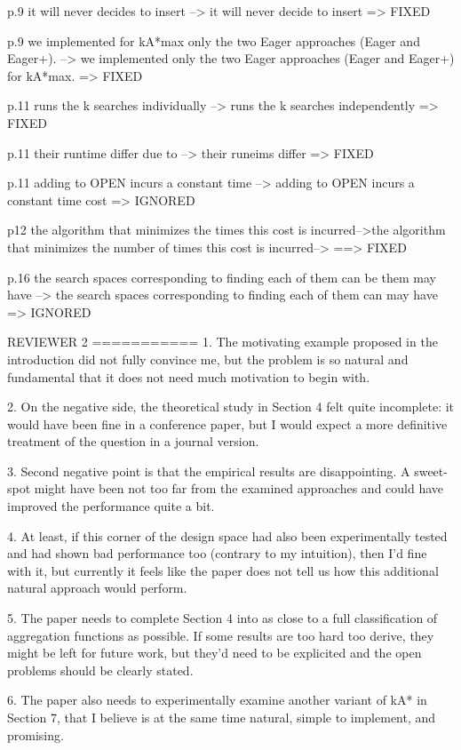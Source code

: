 p.9 it will never decides to insert --> it will never decide to
insert => FIXED

p.9 we implemented for kA*max only the two Eager approaches (Eager and
Eager+). --> we implemented only the two Eager approaches (Eager
and Eager+) for kA*max. => FIXED

p.11 runs the k searches individually --> runs the k searches
independently => FIXED

p.11 their runtime differ due to --> their runeims differ => FIXED

p.11 adding to OPEN incurs a constant time --> adding to OPEN
incurs a constant time cost => IGNORED

p12 the algorithm that minimizes the times this cost is
incurred-->the algorithm that minimizes the number of times this
cost is incurred--> ==> FIXED

p.16 the search spaces corresponding to finding each of them can be
them may have --> the search spaces corresponding to finding each
of them can may have => IGNORED


REVIEWER 2
===========
1. The motivating example proposed in the introduction
did not fully convince me, but the problem is so natural and
fundamental that it does not need much motivation to begin with. 

2. On the negative side, the theoretical study in Section 4 felt quite incomplete: it would have
been fine in a conference paper, but I would expect a more definitive
treatment of the question in a journal version.

3. Second negative point is that the
empirical results are disappointing. A sweet-spot might have been not too far from the
examined approaches and could have improved the performance quite a
bit. 

4. At least, if this corner of the
design space had also been experimentally tested and had shown bad
performance too (contrary to my intuition), then I'd fine with it, but
currently it feels like the paper does not tell us how this additional
natural approach would perform.

5. The paper needs to complete Section 4 into as
close to a full classification of aggregation functions as possible.
If some results are too hard too derive, they might be left for future
work, but they'd need to be explicited and the open problems should be
clearly stated. 

6. The paper also needs to experimentally examine another
variant of kA* in Section 7, that I believe is at the same time
natural, simple to implement, and promising. 

